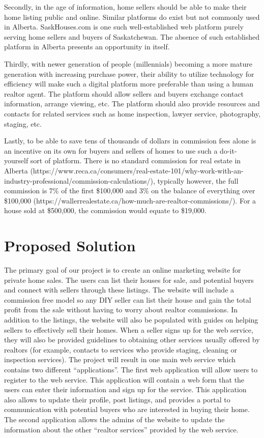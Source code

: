 \documentclass[letterpaper,12pt]{article}
\begin{document}
Secondly, in the age of information, home sellers should be able to make their home listing public and online. Similar platforms do exist but not commonly used in Alberta. SaskHouses.com is one such well-established web platform purely serving home sellers and buyers of Saskatchewan. The absence of such established platform in Alberta presents an opportunity in itself. 

Thirdly, with newer generation of people (millennials) becoming a more mature generation with increasing purchase power, their ability to utilize technology for efficiency will make such a digital platform more preferable than using a human realtor agent. The platform should allow sellers and buyers exchange contact information, arrange viewing, etc. The platform should also provide resources and contacts for related services such as home inspection, lawyer service, photography, staging, etc.

Lastly, to be able to save tens of thousands of dollars in commission fees alone is an incentive on its own for buyers and sellers of homes to use such a do-it-yourself sort of platform. There is no standard commission for real estate in Alberta (https://www.reca.ca/consumers/real-estate-101/why-work-with-an-industry-professional/commission-calculations/), typically however, the full commission is 7\% of the first \$100,000 and 3\% on the balance of everything over \$100,000 (https://wallerrealestate.ca/how-much-are-realtor-commissions/). For a house sold at \$500,000, the commission would equate to \$19,000.


\section{Proposed Solution}

The primary goal of our project is to create an online marketing website for private home sales. The users can list their houses for sale, and potential buyers and connect with sellers through these listings. The website will include a commission free model so any DIY seller can list their house and gain the total profit from the sale without having to worry about realtor commissions. In addition to the listings, the website will also be populated with guides on helping sellers to effectively sell their homes. When a seller signs up for the web service, they will also be provided guidelines to obtaining other services usually offered by realtors (for example, contacts to services who provide staging, cleaning or inspection services).
The project will result in one main web service which contains two different “applications”. The first web application will allow users to register to the web service. This application will contain a web form that the users can enter their information and sign up for the service. This application also allows to update their profile, post listings, and provides a portal to communication with potential buyers who are interested in buying their home. The second application allows the admins of the website to update the information about the other “realtor services” provided by the web service.
\end{document}
